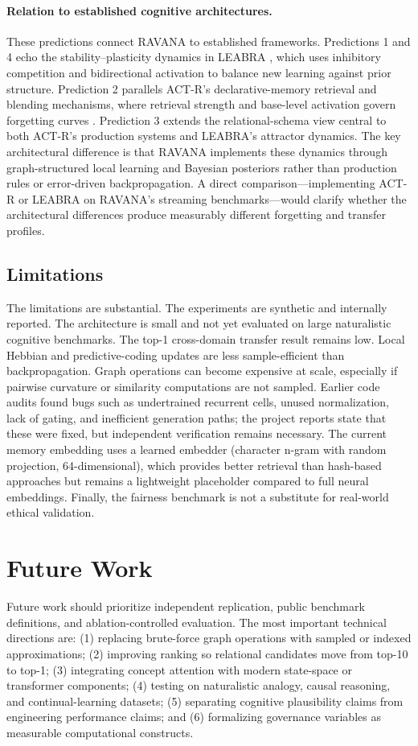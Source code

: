 \documentclass[11pt]{article}
\begin{document}
\paragraph{Relation to established cognitive architectures.}
These predictions connect RAVANA to established frameworks. Predictions 1 and 4 echo the stability--plasticity dynamics in LEABRA \cite{oreilly1996}, which uses inhibitory competition and bidirectional activation to balance new learning against prior structure. Prediction 2 parallels ACT-R's declarative-memory retrieval and blending mechanisms, where retrieval strength and base-level activation govern forgetting curves \cite{anderson2004}. Prediction 3 extends the relational-schema view central to both ACT-R's production systems and LEABRA's attractor dynamics. The key architectural difference is that RAVANA implements these dynamics through graph-structured local learning and Bayesian posteriors rather than production rules or error-driven backpropagation. A direct comparison---implementing ACT-R or LEABRA on RAVANA's streaming benchmarks---would clarify whether the architectural differences produce measurably different forgetting and transfer profiles.

\subsection{Limitations}
The limitations are substantial. The experiments are synthetic and internally reported. The architecture is small and not yet evaluated on large naturalistic cognitive benchmarks. The top-1 cross-domain transfer result remains low. Local Hebbian and predictive-coding updates are less sample-efficient than backpropagation. Graph operations can become expensive at scale, especially if pairwise curvature or similarity computations are not sampled. Earlier code audits found bugs such as undertrained recurrent cells, unused normalization, lack of gating, and inefficient generation paths; the project reports state that these were fixed, but independent verification remains necessary. The current memory embedding uses a learned embedder (character n-gram with random projection, 64-dimensional), which provides better retrieval than hash-based approaches but remains a lightweight placeholder compared to full neural embeddings. Finally, the fairness benchmark is not a substitute for real-world ethical validation.

\section{Future Work}
Future work should prioritize independent replication, public benchmark definitions, and ablation-controlled evaluation. The most important technical directions are: (1) replacing brute-force graph operations with sampled or indexed approximations; (2) improving ranking so relational candidates move from top-10 to top-1; (3) integrating concept attention with modern state-space or transformer components; (4) testing on naturalistic analogy, causal reasoning, and continual-learning datasets; (5) separating cognitive plausibility claims from engineering performance claims; and (6) formalizing governance variables as measurable computational constructs.
\end{document}
